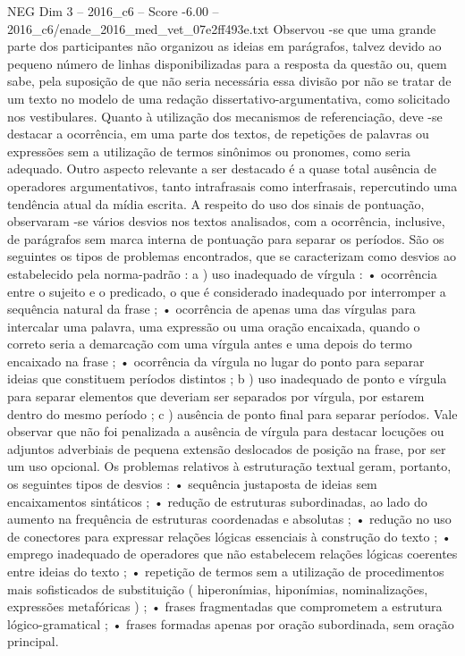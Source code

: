 \begin{textsample}{NEG Dim 3 – 2016\_c6 – Score -6.00 – 2016\_c6/enade\_2016\_med\_vet\_07e2ff493e.txt}
Observou -se que uma grande parte dos participantes não organizou as ideias em parágrafos, talvez devido ao pequeno número de linhas disponibilizadas para a resposta da questão ou, quem sabe, pela suposição de que não seria necessária essa divisão por não se tratar de um texto no modelo de uma redação dissertativo-argumentativa, como solicitado nos vestibulares.
Quanto à utilização dos mecanismos de referenciação, deve -se destacar a ocorrência, em uma parte dos textos, de repetições de palavras ou expressões sem a utilização de termos sinônimos ou pronomes, como seria adequado.
Outro aspecto relevante a ser destacado é a quase total ausência de operadores argumentativos, tanto intrafrasais como interfrasais, repercutindo uma tendência atual da mídia escrita.
A respeito do uso dos sinais de pontuação, observaram -se vários desvios nos textos analisados, com a ocorrência, inclusive, de parágrafos sem marca interna de pontuação para separar os períodos.
São os seguintes os tipos de problemas encontrados, que se caracterizam como desvios ao estabelecido pela norma-padrão : a ) uso inadequado de vírgula : • ocorrência entre o sujeito e o predicado, o que é considerado inadequado por interromper a sequência natural da frase ; • ocorrência de apenas uma das vírgulas para intercalar uma palavra, uma expressão ou uma oração encaixada, quando o correto seria a demarcação com uma vírgula antes e uma depois do termo encaixado na frase ; • ocorrência da vírgula no lugar do ponto para separar ideias que constituem períodos distintos ; b ) uso inadequado de ponto e vírgula para separar elementos que deveriam ser separados por vírgula, por estarem dentro do mesmo período ; c ) ausência de ponto final para separar períodos.
Vale observar que não foi penalizada a ausência de vírgula para destacar locuções ou adjuntos adverbiais de pequena extensão deslocados de posição na frase, por ser um uso opcional.
Os problemas relativos à estruturação textual geram, portanto, os seguintes tipos de desvios : • sequência justaposta de ideias sem encaixamentos sintáticos ; • redução de estruturas subordinadas, ao lado do aumento na frequência de estruturas coordenadas e absolutas ; • redução no uso de conectores para expressar relações lógicas essenciais à construção do texto ; • emprego inadequado de operadores que não estabelecem relações lógicas coerentes entre ideias do texto ; • repetição de termos sem a utilização de procedimentos mais sofisticados de substituição ( hiperonímias, hiponímias, nominalizações, expressões metafóricas ) ; • frases fragmentadas que comprometem a estrutura lógico-gramatical ; • frases formadas apenas por oração subordinada, sem oração principal.

\end{textsample}
